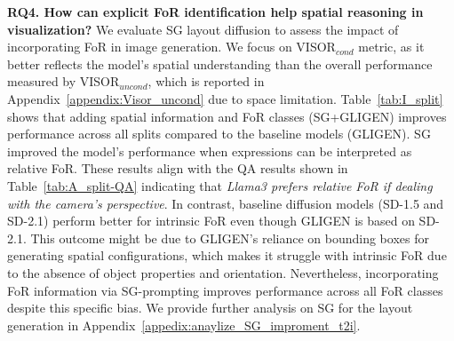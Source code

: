 \noindent\textbf{RQ4. How can explicit FoR identification help spatial reasoning in visualization?}
We evaluate SG layout diffusion to assess the impact of incorporating FoR in image generation. 
We focus on VISOR$_{cond}$ metric, as it better reflects the model’s spatial understanding than the overall performance measured by VISOR$_{uncond}$, which is reported in Appendix~\ref{appendix:Visor_uncond} due to space limitation.
Table~\ref{tab:I_split} shows that adding spatial information and FoR classes (SG+GLIGEN) improves performance across all splits compared to the baseline models (GLIGEN).
SG improved the model's performance when expressions can be interpreted as relative FoR.
These results align with the QA results shown in Table~\ref{tab:A_split-QA} indicating that \textit{Llama3  prefers relative FoR if dealing with the camera's perspective}.
In contrast, baseline diffusion models (SD-1.5 and SD-2.1) perform better for intrinsic FoR even though GLIGEN is based on SD-2.1.
This outcome might be due to GLIGEN's reliance on bounding boxes for generating spatial configurations, which makes it struggle with intrinsic FoR due to the absence of object properties and orientation. Nevertheless, incorporating FoR information via SG-prompting improves performance across all FoR classes despite this specific bias.
We provide further analysis on SG for the layout generation in Appendix~\ref{appedix:anaylize_SG_improment_t2i}.